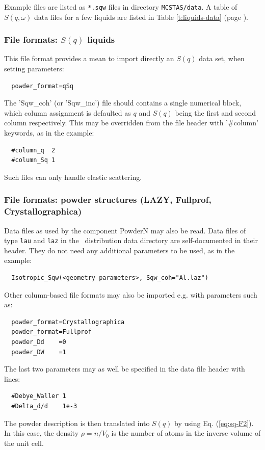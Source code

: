 Example files are listed as \verb+*.sqw+ files in directory \verb+MCSTAS/data+. A table of $S(q,\omega)$ data files for a few liquids are listed in Table \ref{t:liquids-data} (page \pageref{t:liquids-data}).

\subsubsection{File formats: $S(q)$ liquids}

This file format provides a mean to import directly an $S(q)$ data set, when setting parameters:
\begin{verbatim}
  powder_format=qSq
\end{verbatim}
The 'Sqw\_coh' (or 'Sqw\_inc') file should contains a single numerical block, which column assignment is defaulted as $q$ and $S(q)$ being the first and second column respectively. This may be overridden from the file header with '\#column' keywords, as in the example:
\begin{verbatim}
  #column_q  2
  #column_Sq 1
\end{verbatim}
Such files can only handle elastic scattering.

\subsubsection{File formats: powder structures (LAZY, Fullprof, Crystallographica)}

Data files as used by the component PowderN may also be read. Data files of type \verb'lau' and \verb'laz' in the \MCS\ distribution data directory are self-documented in their header. They do not need any additional parameters to be used, as in the example:
\begin{verbatim}
  Isotropic_Sqw(<geometry parameters>, Sqw_coh="Al.laz")
\end{verbatim}
Other column-based file formats may also be imported e.g. with parameters such as:
\begin{verbatim}
  powder_format=Crystallographica
  powder_format=Fullprof
  powder_Dd    =0
  powder_DW    =1
\end{verbatim}
The last two parameters may as well be specified in the data file header with lines:
\begin{verbatim}
  #Debye_Waller 1
  #Delta_d/d    1e-3
\end{verbatim}
The powder description is then translated into $S(q)$ by using Eq. (\ref{eq:sq-F2}).
In this case, the density $\rho = n/V_0$ is the number of atoms in the inverse volume of the unit cell.


